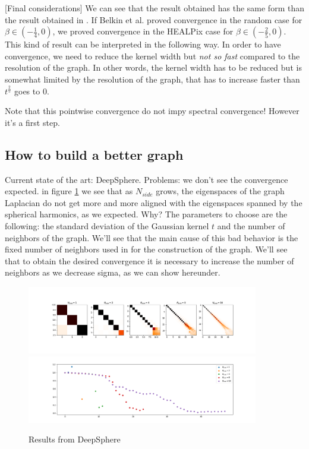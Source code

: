 [Final considerations]
We can see that the result obtained has the same form than the result obtained in \cite{Belkin:2005:TTF:2138147.2138189}. If Belkin et al. proved convergence in the random case for $\beta \in (-\frac{1}{4}, 0)$, we proved convergence in the HEALPix case for $\beta \in (-\frac{2}{5}, 0)$. This kind of result can be interpreted in the following way. In order to have convergence, we need to reduce the kernel width but \textit{not so fast} compared to the resolution of the graph. In other words, the kernel width has to be reduced but is somewhat limited by the resolution of the graph, that has to increase faster than $t^\frac{2}{5}$ goes to $0$.\\
\begin{remark}
	Note that this pointwise convergence do not impy spectral convergence! However it's a first step. 
\end{remark}
\subsection{How to build a better graph}
Current state of the art: DeepSphere.
Problems: we don't see the convergence expected. in figure \ref{fig:DeepSphere} we see that as $N_{side}$ grows, the eigenspaces of the graph Laplacian do not get more and more aligned with the eigenspaces spanned by the spherical harmonics, as we expected. Why? The parameters to choose are the following: the standard deviation of the Gaussian kernel $t$ and the number of neighbors of the graph. We'll see that the main cause of this bad behavior is the fixed number of neighbors used in \cite{DeepSphere} for the construction of the graph. We'll see that to obtain the desired convergence it is necessary to increase the number of neighbors as we decrease sigma, as we can show hereunder.
\begin{figure}[h]
	\label{fig:DeepSphere}
	\caption{Results from DeepSphere}
	\centering
	\includegraphics[width=0.9\textwidth]{../codes/02.HeatKernelGraphLaplacian/HEALPix/06_figures/deepsphere_original.png}
	\includegraphics[width=0.9\textwidth]{../codes/02.HeatKernelGraphLaplacian/HEALPix/06_figures/deepsphere_original_diagonal.png}	
\end{figure}
